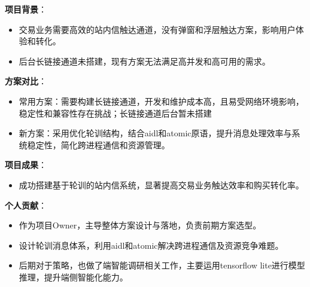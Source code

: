 \documentclass[]{deedy-resume-openfont}
\begin{document}
\newpage
\begin{minipage}[t]{0.2\textwidth} \end{minipage}
\hfill
\begin{minipage}[t]{0.75\textwidth} 
\vspace{0.1em}
\vspace{0.1em}
\begin{tightemize}
    \item \textbf{项目背景}：
        \begin{itemize}
            \item 交易业务需要高效的站内信触达通道，没有弹窗和浮层触达方案，影响用户体验和转化。
            \item 后台长链接通道未搭建，现有方案无法满足高并发和高可用的需求。
        \end{itemize}
    \item \textbf{方案对比}：
        \begin{itemize}
            \item 常用方案：需要构建长链接通道，开发和维护成本高，且易受网络环境影响，稳定性和兼容性存在挑战；长链接通道后台暂未搭建
            \item 新方案：采用优化轮训结构，结合aidl和atomic原语，提升消息处理效率与系统稳定性，简化跨进程通信和资源管理。
        \end{itemize}
    \item \textbf{项目成果}：
        \begin{itemize}
            \item 成功搭建基于轮训的站内信系统，显著提高交易业务触达效率和购买转化率。
        \end{itemize}
    \item \textbf{个人贡献}：
        \begin{itemize}
            \item 作为项目Owner，主导整体方案设计与落地，负责前期方案选型。
            \item 设计轮训消息体系，利用aidl和atomic解决跨进程通信及资源竞争难题。
            \item 后期对于策略，也做了端智能调研相关工作，主要运用tensorflow lite进行模型推理，提升端侧智能化能力。
        \end{itemize}
\end{tightemize}


\end{minipage}
\end{document}
